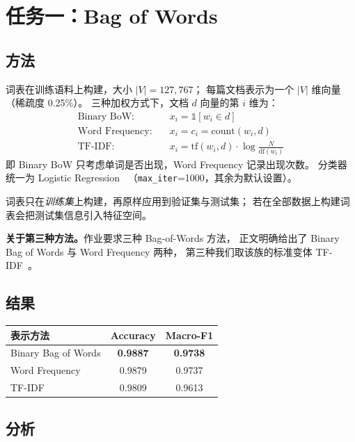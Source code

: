 \documentclass[10pt,twocolumn,letterpaper]{article}
\begin{document}
\section{任务一：Bag of Words}
\label{sec:task1}

\subsection{方法}

词表在训练语料上构建，大小 $|V| = 127{,}767$；
每篇文档表示为一个 $|V|$ 维向量（稀疏度 0.25\%）。
三种加权方式下，文档 $d$ 向量的第 $i$ 维为：
\begin{align}
\text{Binary BoW:}\quad & x_i = \mathbb{1}[w_i \in d] \\
\text{Word Frequency:}\quad & x_i = c_i = \mathrm{count}(w_i, d) \\
\text{TF-IDF:}\quad & x_i = \mathrm{tf}(w_i,d)\cdot \log\frac{N}{\mathrm{df}(w_i)}
\end{align}
即 Binary BoW 只考虑单词是否出现，Word Frequency 记录出现次数。
分类器统一为 Logistic Regression~\cite{pedregosa2011scikit}
（\texttt{max\_iter}=1000，其余为默认设置）。

词表只在\emph{训练集}上构建，再原样应用到验证集与测试集；
若在全部数据上构建词表会把测试集信息引入特征空间。

\textbf{关于第三种方法。}作业要求三种 Bag-of-Words 方法，
正文明确给出了 Binary Bag of Words 与 Word Frequency 两种，
第三种我们取该族的标准变体 TF-IDF~\cite{salton1988term}。

\subsection{结果}

\begin{center}\small
\begin{tabular}{lcc}
\toprule
表示方法 & Accuracy & Macro-F1 \\
\midrule
Binary Bag of Words & \textbf{0.9887} & \textbf{0.9738} \\
Word Frequency      & 0.9879 & 0.9737 \\
TF-IDF              & 0.9809 & 0.9613 \\
\bottomrule
\end{tabular}
\end{center}

\subsection{分析}
\end{document}
